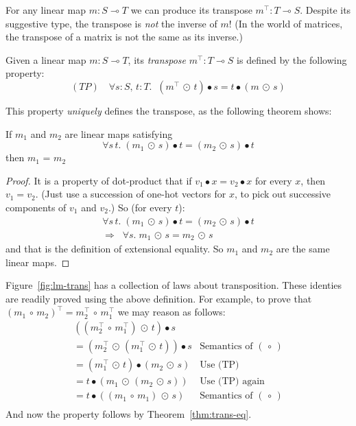 \documentclass[sigplan,review]{acmart}
\newcommand{\linto}{\multimap}     %
\newcommand{\tcolon}{\!:\!}
\newcommand{\dotprod}{\bullet}    %
\newcommand{\lmcomp}{\,\circ\,}   %
\newcommand{\lmapply}{\,\odot\,}      %
\newcommand{\lmtrans}[1]{#1^{\top}}   %
\begin{document}
For any linear map $m \tcolon S \linto T$ we can produce its transpose $\lmtrans{m} : T \linto S$.
Despite its suggestive type, the transpose is \emph{not} the inverse of $m$!  (In the world of matrices,
the transpose of a matrix is not the same as its inverse.)

\begin{definition}
Given a linear map $m : S \linto T$, its \emph{transpose} $\lmtrans{m} : T \linto S$
is defined by the following property:
$$
(TP)\quad \forall s\tcolon S,\, t \tcolon T.\;\;  (\lmtrans{m} \lmapply t) \dotprod s =  t \dotprod (m \lmapply s)
$$
\end{definition}
\noindent
This property \emph{uniquely} defines the transpose, as the following theorem shows:
\begin{theorem} \label{thm:trans-eq}
  If $m_1$ and $m_2$ are linear maps satisfying
  $$\forall s\, t.\; (m_1 \lmapply s) \dotprod t
                              = (m_2 \lmapply s) \dotprod t$$
  then $m_1$ = $m_2$
\end{theorem}
\begin{proof}
  It is a property of dot-product that if $v_1 \dotprod x = v_2 \dotprod x$ for every
  $x$, then $v_1 = v_2$.  (Just use a succession of one-hot vectors for $x$,
  to pick out successive components of $v_1$ and $v_2$.) So
  (for every $t$):
$$
\begin{array}{ll}
\forall s\, t.\; (m_1 \lmapply s) \dotprod t
                              = (m_2 \lmapply s) \dotprod t \\
\Rightarrow \;\; \forall s. \; m_1 \lmapply s = m_2 \lmapply s
\end{array}
$$
and that is the definition of extensional equality. So $m_1$ and $m_2$ are the same linear maps.
\end{proof}
Figure~\ref{fig:lm-trans} has a collection of laws about transposition.
These identies are readily proved using the above definition. For example, to prove that
$\lmtrans{(m_1 \lmcomp m_2)}  =  \lmtrans{m_2} \lmcomp \lmtrans{m_1}$ we may reason as follows:
$$
\begin{array}{ll}
  ((\lmtrans{m_2} \lmcomp \lmtrans{m_1}) \lmapply t) \dotprod s \\
  = (\lmtrans{m_2} \lmapply (\lmtrans{m_1} \lmapply t)) \dotprod s  & \mbox{Semantics of $(\lmcomp)$} \\
  = (\lmtrans{m_1} \lmapply t) \dotprod (m_2 \lmapply s)  & \mbox{Use (TP)} \\
  = t \dotprod (m_1 \lmapply (m_2 \lmapply s))  & \mbox{Use (TP) again} \\
  = t \dotprod ((m_1 \lmcomp m_1) \lmapply s)  & \mbox{Semantics of $(\lmcomp)$} \\
\end{array}
$$
And now the property follows by Theorem~\ref{thm:trans-eq}.
\end{document}
